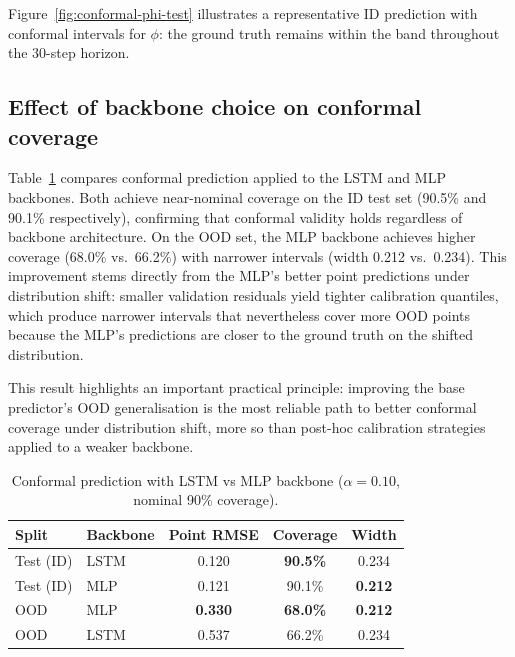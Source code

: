 \documentclass[a4paper,fleqn]{cas-sc}
\begin{document}
Figure~\ref{fig:conformal-phi-test} illustrates a representative ID prediction with conformal intervals for $\phi$: the ground truth remains within the band throughout the 30-step horizon.

\subsection{Effect of backbone choice on conformal coverage}

Table~\ref{tab:conformal-backbone} compares conformal prediction applied to the LSTM and MLP backbones. Both achieve near-nominal coverage on the ID test set (90.5\% and 90.1\% respectively), confirming that conformal validity holds regardless of backbone architecture. On the OOD set, the MLP backbone achieves higher coverage (68.0\% vs.\ 66.2\%) with narrower intervals (width 0.212 vs.\ 0.234). This improvement stems directly from the MLP's better point predictions under distribution shift: smaller validation residuals yield tighter calibration quantiles, which produce narrower intervals that nevertheless cover more OOD points because the MLP's predictions are closer to the ground truth on the shifted distribution.

This result highlights an important practical principle: improving the base predictor's OOD generalisation is the most reliable path to better conformal coverage under distribution shift, more so than post-hoc calibration strategies applied to a weaker backbone.

\begin{table}[t]
    \centering
    \caption{Conformal prediction with LSTM vs MLP backbone ($\alpha=0.10$, nominal 90\% coverage).}
    \label{tab:conformal-backbone}
    \begin{tabular}{llccc}
        \toprule
        \textbf{Split} & \textbf{Backbone} & \textbf{Point RMSE} & \textbf{Coverage} & \textbf{Width} \\
        \midrule
        Test (ID) & LSTM & 0.120 & \textbf{90.5\%} & 0.234 \\
        Test (ID) & MLP  & 0.121 & 90.1\%          & \textbf{0.212} \\
        \midrule
        OOD & MLP  & \textbf{0.330} & \textbf{68.0\%} & \textbf{0.212} \\
        OOD & LSTM & 0.537          & 66.2\%           & 0.234 \\
        \bottomrule
    \end{tabular}
\end{table}
\end{document}
